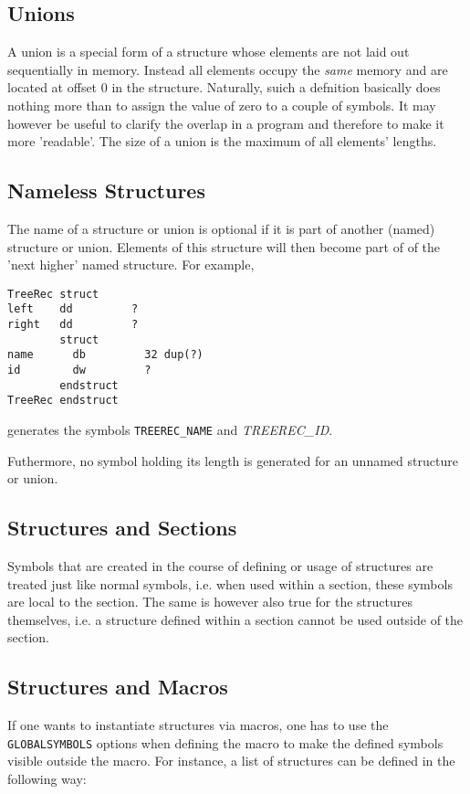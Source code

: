 \documentclass[12pt,twoside]{report}
\newcommand{\tty}[1]{{\tt #1}}
\begin{document}
\subsection{Unions}

A union is a special form of a structure whose elements are not laid out
sequentially in memory.  Instead all elements occupy the {\em same}
memory and are located at offset 0 in the structure.  Naturally, suich a
defnition basically does nothing more than to assign the value of zero to
a couple of symbols.  It may however be useful to clarify the overlap in a
program and therefore to make it more 'readable'.  The size of a union is
the maximum of all elements' lengths.

\subsection{Nameless Structures}

The name of a structure or union is optional if it is part of
another (named) structure or union.  Elements of this structure
will then become part of of the 'next higher' named structure.
For example,
\begin{verbatim}
TreeRec struct
left    dd         ?
right   dd         ?
        struct
name      db         32 dup(?)
id        dw         ?
        endstruct
TreeRec endstruct
\end{verbatim}
generates the symbols {\tt TREEREC\_NAME} and {\em TREEREC\_ID}.

Futhermore, no symbol holding its length is generated for an
unnamed structure or union.

\subsection{Structures and Sections}

Symbols that are created in the course of defining or usage of structures
are treated just like normal symbols, i.e. when used within a section,
these symbols are local to the section.  The same is however also true for
the structures themselves, i.e. a structure defined within a section
cannot be used outside of the section.

\subsection{Structures and Macros}

If one wants to instantiate structures via macros, one has to use
the \tty{GLOBALSYMBOLS} options when defining the macro to make
the defined symbols visible outside the macro.  For instance, a
list of structures can be defined in the following way:
\end{document}
